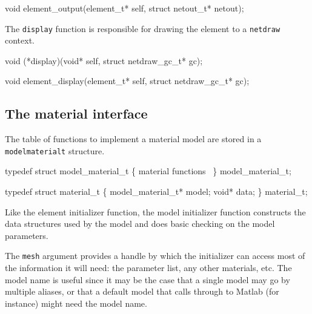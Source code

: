 \nwenddocs{}\plusendmoddef
void element_output(element_t* self, struct netout_t* netout);
\nwendcode{}\nwdocspar


The {\tt{}display} function is responsible for drawing the element
to a {\tt{}netdraw} context.

\nwenddocs{}\plusendmoddef
void (*display)(void* self, struct netdraw_gc_t* gc);
\nwendcode{}\nwdocspar

\nwenddocs{}\plusendmoddef
void element_display(element_t* self, struct netdraw_gc_t* gc);
\nwendcode{}\nwdocspar


\subsection{The material interface}

The table of functions to implement a material model are stored in
a {\tt{}model{}material{}t} structure.

\nwenddocs{}\plusendmoddef
typedef struct model_material_t \{
    \LA{}material functions~{\nwtagstyle{}}\RA{}
\} model_material_t;

typedef struct material_t \{
    model_material_t* model;
    void* data;
\} material_t;

\nwendcode{}\nwdocspar

Like the element initializer function, the model initializer function
constructs the data structures used by the model and does basic
checking on the model parameters.

The {\tt{}mesh} argument provides a handle by which the initializer can
access most of the information it will need: the parameter list,
any other materials, etc.  The model name is useful since it may
be the case that a single model may go by multiple aliases,
or that a default model that calls through to Matlab (for instance)
might need the model name.

